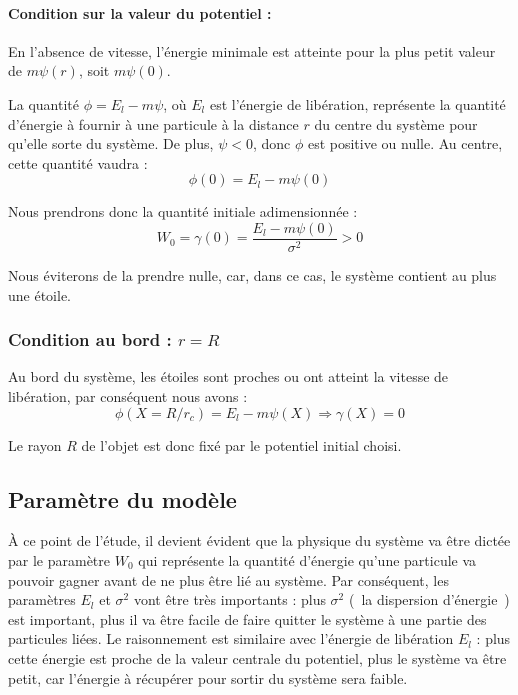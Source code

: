 		\paragraph{Condition sur la valeur du potentiel :}
			En l'absence de vitesse, l'énergie minimale est atteinte pour la plus petit valeur de $m\psi(r)$, soit $m\psi(0)$.

			La quantité $\phi=E_l-m\psi$, où $E_l$ est l'énergie de libération,
			représente la quantité d'énergie à fournir à une particule à la distance $r$
			du centre du système pour qu'elle sorte du système. De plus, $\psi <0$, donc
			$\phi$ est positive ou nulle. Au centre, cette quantité vaudra :
			$$\phi(0)=E_l-m\psi(0)$$

			Nous prendrons donc la quantité initiale adimensionnée :
			\begin{equation}
				W_0 = \gamma(0)=\frac{E_l - m\psi(0)}{\sigma^2} > 0
				\label{W_0}
			\end{equation}

			Nous éviterons de la prendre nulle, car, dans ce cas, le système contient au
			plus une étoile.

	\subsubsection{Condition au bord : $r=R$}
		Au bord du système, les étoiles sont proches ou ont atteint la vitesse de
		libération, par conséquent nous avons :
		\begin{equation}
			\phi(X=R/r_c) = E_l - m\psi(X) \Rightarrow \gamma(X) = 0
		\end{equation}

		Le rayon $R$ de l'objet est donc fixé par le potentiel initial choisi.

\subsection{Paramètre du modèle}
	À ce point de l'étude, il devient évident que la physique du système va être dictée par le paramètre $W_0$ qui représente la quantité d'énergie qu'une particule va
	pouvoir gagner avant de ne plus être lié au système. Par conséquent, les paramètres $E_l$ et $\sigma^2$ vont être très importants : plus $\sigma^2$ (~la dispersion
	d'énergie~) est important, plus il va être facile de faire quitter le système à une partie des particules liées. Le raisonnement est similaire avec l'énergie de
	libération $E_l$ : plus cette énergie est proche de la valeur centrale du potentiel, plus le système va être petit, car l'énergie à récupérer pour sortir du système
	sera faible.

